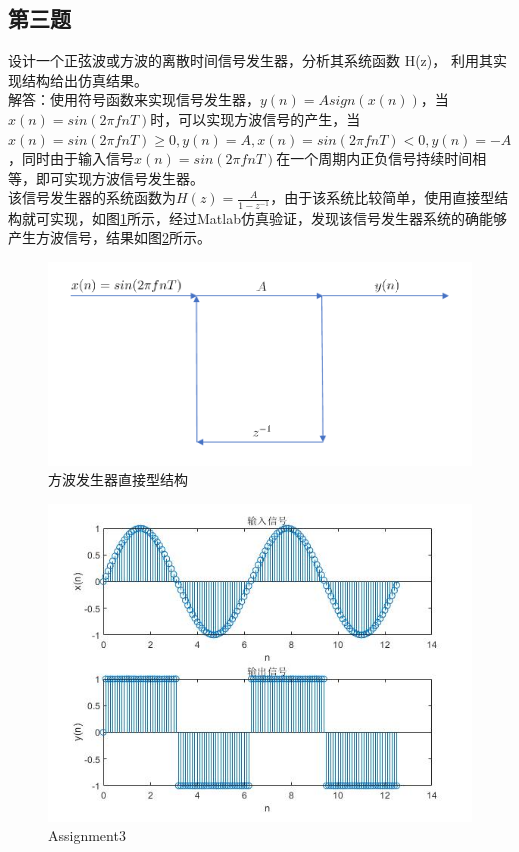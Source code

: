 \documentclass{seuer}
\begin{document}
\subsection{第三题}
设计一个正弦波或方波的离散时间信号发生器，分析其系统函数 H(z)，
利用其实现结构给出仿真结果。
\\解答：使用符号函数来实现信号发生器，$y(n)=Asign(x(n))$，当$x(n)=sin(2\pi fnT)$时，可以实现方波信号的产生，当$x(n)=sin(2\pi fnT)\ge0, y(n)=A,x(n)=sin(2\pi fnT)<0, y(n)=-A$，同时由于输入信号$x(n)=sin(2\pi fnT)$在一个周期内正负信号持续时间相等，即可实现方波信号发生器。
\\该信号发生器的系统函数为$H(z)=\frac{A}{1-z^{-1}}$，由于该系统比较简单，使用直接型结构就可实现，如图\ref{Fig3}所示，经过Matlab仿真验证，发现该信号发生器系统的确能够产生方波信号，结果如图\ref{Fig4}所示。
\begin{figure}[H] %
	\centering %
	\includegraphics[width=1\textwidth]{"符号函数.pdf"} %
	\caption{方波发生器直接型结构} %
	\label{Fig3} %
\end{figure}
\begin{figure}[H] %
	\centering %
	\includegraphics[width=1\textwidth]{"../DSPAssignment/Assignment3.jpg"} %
	\caption{Assignment3} %
	\label{Fig4} %
\end{figure}
\end{document}
